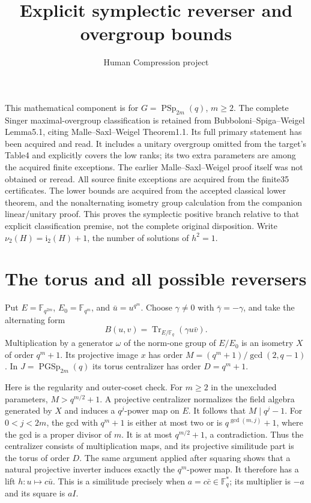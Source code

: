 \documentclass[10pt]{article}
\title{Explicit symplectic reverser and overgroup bounds}
\author{Human Compression project}\date{}
\newcommand{\ii}{\mathrm i_2}\newcommand{\nuu}{\nu_2}\newcommand{\F}{\mathbb F}\newcommand{\GL}{\operatorname{GL}}\newcommand{\GU}{\operatorname{GU}}\newcommand{\Sp}{\operatorname{Sp}}\newcommand{\PSp}{\operatorname{PSp}}\newcommand{\PGSp}{\operatorname{PGSp}}\newcommand{\Aut}{\operatorname{Aut}}
\begin{document}
\maketitle
This mathematical component is for $G=\PSp_{2m}(q)$, $m\ge2$.
The complete Singer maximal-overgroup classification is retained from
Bubboloni--Spiga--Weigel Lemma5.1, citing Malle--Saxl--Weigel Theorem1.1.
Its full primary statement has been acquired and read. It includes a unitary
overgroup omitted from the target's Table4 and explicitly covers the low
ranks; its two extra parameters are among the acquired finite exceptions.
The earlier Malle--Saxl--Weigel proof itself was not obtained or reread.
All source finite exceptions are acquired from the finite35 certificates.
The lower bounds are acquired from the accepted classical lower theorem,
and the nonalternating isometry group calculation from the companion
linear/unitary proof. This proves the symplectic positive branch relative to that explicit
classification premise, not the complete original disposition.
Write $\nuu(H)=\ii(H)+1$, the number of solutions of $h^2=1$.

\section{The torus and all possible reversers}
Put $E=\F_{q^{2m}}$, $E_0=\F_{q^m}$, and $\bar u=u^{q^m}$. Choose
$\gamma\ne0$ with $\bar\gamma=-\gamma$, and take the alternating form
\[
 B(u,v)=\operatorname{Tr}_{E/\F_q}(\gamma u\bar v).
\]
Multiplication by a generator $\omega$ of the norm-one group of $E/E_0$
is an isometry $X$ of order $q^m+1$. Its projective image $x$ has order
$M=(q^m+1)/\gcd(2,q-1)$. In $J=\PGSp_{2m}(q)$ its torus centralizer
has order $D=q^m+1$.

Here is the regularity and outer-coset check. For $m\ge2$ in the unexcluded
parameters, $M>q^{m/2}+1$. A projective centralizer normalizes the field
algebra generated by $X$ and induces a $q^j$-power map on $E$. It follows
that $M\mid q^j-1$. For $0<j<2m$, the gcd with $q^m+1$ is either at most
two or is $q^{\gcd(m,j)}+1$, where the gcd is a proper divisor of $m$.
It is at most $q^{m/2}+1$, a contradiction. Thus the centralizer consists
of multiplication maps, and its projective similitude part is the torus of
order $D$. The same argument applied after squaring shows that a natural
projective inverter induces exactly the $q^m$-power map. It therefore has a
lift $h:u\mapsto c\bar u$. This is a similitude precisely when
$a=c\bar c\in\F_q^*$; its multiplier is $-a$ and its square is $aI$.
\end{document}
